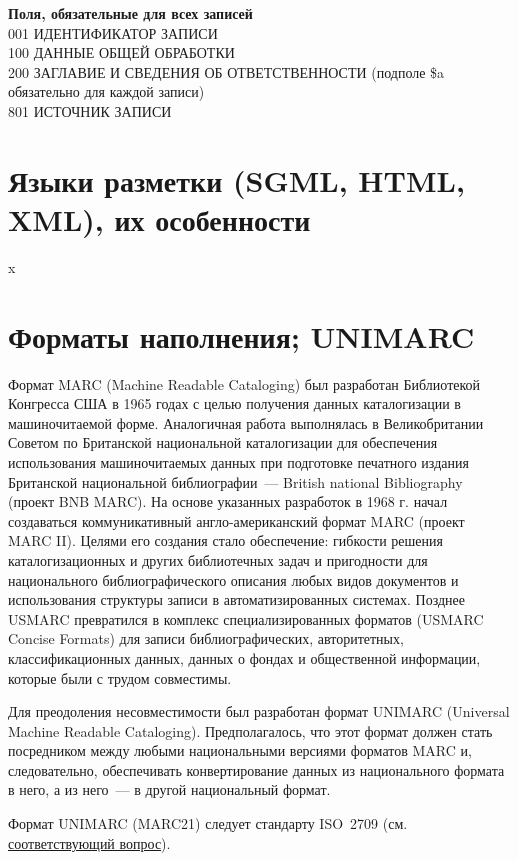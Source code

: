 \documentclass[12pt]{article}
\theoremstyle{definition}
\theoremstyle{remark}
\numberwithin{equation}{section}
\begin{document}
\textbf{Поля, обязательные для всех записей}
\\
001 ИДЕНТИФИКАТОР ЗАПИСИ \\
100 ДАННЫЕ ОБЩЕЙ ОБРАБОТКИ \\
200 ЗАГЛАВИЕ И СВЕДЕНИЯ ОБ ОТВЕТСТВЕННОСТИ (подполе \$a обязательно для каждой записи) \\
801 ИСТОЧНИК ЗАПИСИ \\

\section{Языки разметки (SGML, HTML, XML), их особенности}
x
\section{Форматы наполнения; UNIMARC}
Формат MARC (Machine Readable Cataloging) был разработан Библиотекой Конгресса США в 1965 годах с целью получения данных каталогизации в машиночитаемой форме. Аналогичная работа выполнялась в Великобритании Советом по Британской национальной каталогизации для обеспечения использования машиночитаемых данных при подготовке печатного издания Британской национальной библиографии~--- British national Bibliography (проект BNB MARC). На основе указанных разработок в 1968 г. начал создаваться коммуникативный англо\nobreakdash-американский формат MARC (проект MARC II). Целями его создания стало обеспечение: гибкости решения каталогизационных и других библиотечных задач и пригодности для национального библиографического описания любых видов документов и использования структуры записи в автоматизированных системах. Позднее USMARC превратился в комплекс специализированных форматов (USMARC Concise Formats) для записи библиографических, авторитетных, классификационных данных, данных о фондах и общественной информации, которые были с трудом совместимы.

Для преодоления несовместимости был разработан формат UNIMARC (Universal Machine Readable Cataloging). Предполагалось, что этот формат должен стать посредником между любыми национальными версиями форматов MARC и, следовательно, обеспечивать конвертирование данных из национального формата в него, а из него~--- в другой национальный формат.

Формат UNIMARC (MARC21) следует стандарту ISO~2709 (см. \hyperref[subsec:ISO]{соответствующий вопрос}).
\end{document}
